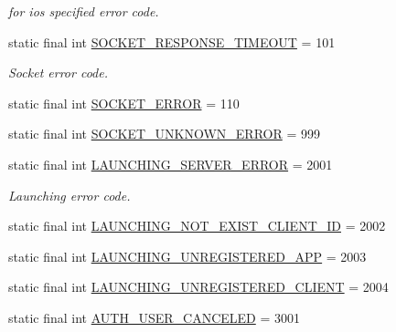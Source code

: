 \begin{DoxyCompactItemize}
\begin{DoxyCompactList}\small\item\em for ios specified error code. \end{DoxyCompactList}\item 
static final int \hyperlink{classcom_1_1toast_1_1android_1_1gamebase_1_1base_1_1_gamebase_error_ace876501a04e69d568dc5a85c5536804}{S\+O\+C\+K\+E\+T\+\_\+\+R\+E\+S\+P\+O\+N\+S\+E\+\_\+\+T\+I\+M\+E\+O\+UT} = 101
\begin{DoxyCompactList}\small\item\em Socket error code. \end{DoxyCompactList}\item 
static final int \hyperlink{classcom_1_1toast_1_1android_1_1gamebase_1_1base_1_1_gamebase_error_a010b2b2f8b503acc062ef7c480cb7aa2}{S\+O\+C\+K\+E\+T\+\_\+\+E\+R\+R\+OR} = 110
\item 
static final int \hyperlink{classcom_1_1toast_1_1android_1_1gamebase_1_1base_1_1_gamebase_error_a4743676acd0471d3d6248b8efca76dbf}{S\+O\+C\+K\+E\+T\+\_\+\+U\+N\+K\+N\+O\+W\+N\+\_\+\+E\+R\+R\+OR} = 999
\item 
static final int \hyperlink{classcom_1_1toast_1_1android_1_1gamebase_1_1base_1_1_gamebase_error_a8afd99e2087ecd3562a9ae044f635f0a}{L\+A\+U\+N\+C\+H\+I\+N\+G\+\_\+\+S\+E\+R\+V\+E\+R\+\_\+\+E\+R\+R\+OR} = 2001
\begin{DoxyCompactList}\small\item\em Launching error code. \end{DoxyCompactList}\item 
static final int \hyperlink{classcom_1_1toast_1_1android_1_1gamebase_1_1base_1_1_gamebase_error_ade65abd1b2745d2661b5211a8e05df61}{L\+A\+U\+N\+C\+H\+I\+N\+G\+\_\+\+N\+O\+T\+\_\+\+E\+X\+I\+S\+T\+\_\+\+C\+L\+I\+E\+N\+T\+\_\+\+ID} = 2002
\item 
static final int \hyperlink{classcom_1_1toast_1_1android_1_1gamebase_1_1base_1_1_gamebase_error_a0c64c2269f5f45c4654d82326b87d193}{L\+A\+U\+N\+C\+H\+I\+N\+G\+\_\+\+U\+N\+R\+E\+G\+I\+S\+T\+E\+R\+E\+D\+\_\+\+A\+PP} = 2003
\item 
static final int \hyperlink{classcom_1_1toast_1_1android_1_1gamebase_1_1base_1_1_gamebase_error_a3c9c4952006aa1c4eae5c564155cdcb9}{L\+A\+U\+N\+C\+H\+I\+N\+G\+\_\+\+U\+N\+R\+E\+G\+I\+S\+T\+E\+R\+E\+D\+\_\+\+C\+L\+I\+E\+NT} = 2004
\item 
static final int \hyperlink{classcom_1_1toast_1_1android_1_1gamebase_1_1base_1_1_gamebase_error_aa787b2661e800ee9df677219dbdd0aba}{A\+U\+T\+H\+\_\+\+U\+S\+E\+R\+\_\+\+C\+A\+N\+C\+E\+L\+ED} = 3001

\end{DoxyCompactItemize}
